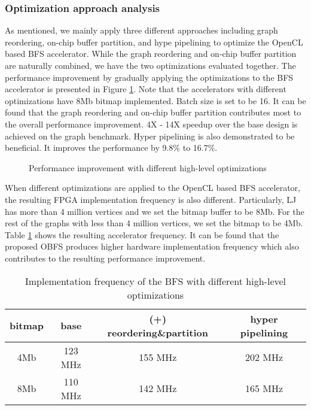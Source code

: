 \subsubsection{Optimization approach analysis}
As mentioned, we mainly apply three different approaches including 
graph reordering, on-chip buffer partition,  
and hype pipelining to optimize the OpenCL based BFS accelerator.
While the graph reordering and on-chip buffer partition are naturally combined, 
we have the two optimizations evaluated together. The performance improvement 
by gradually applying the optimizations to the BFS accelerator is presented 
in Figure \ref{fig:opt-analysis}. Note that the accelerators with different 
optimizations have 8Mb bitmap implemented. Batch size is set to be 16.
It can be found that the graph reordering and on-chip buffer partition 
contributes most to the overall performance improvement. 
4X - 14X speedup over the base design is achieved on the graph benchmark. 
Hyper pipelining is also demonstrated to be beneficial. 
It improves the performance by 9.8\% to 16.7\%. 

 \begin{figure}
	\caption{Performance improvement with different high-level optimizations}
\label{fig:opt-analysis}
\vspace{-1em}
\end{figure}

When different optimizations are applied to the OpenCL based BFS accelerator, 
the resulting FPGA implementation frequency is also different. 
Particularly, LJ has more than 4 million vertices and we set the bitmap buffer to be 8Mb. 
For the rest of the graphs with less than 4 million vertices, we set the bitmap to be 4Mb. 
Table \ref{tab:opt-freq} shows the resulting accelerator frequency. 
It can be found that the proposed OBFS produces higher hardware 
implementation frequency which also contributes to the resulting 
performance improvement. 

\begin{table}
  \caption{Implementation frequency of the BFS with different high-level optimizations}
  \label{tab:opt-freq}
    \setlength{\tabcolsep}{4pt} %
	\centering
  \begin{tabular}{cccc}
    \toprule
	bitmap & base & (+) reordering\&partition & hyper pipelining \\
	\midrule
	4Mb & 123 MHz & 155 MHz & 202 MHz\\
	8Mb & 110 MHz & 142 MHz & 165 MHz\\
  \bottomrule
\end{tabular}
\vspace{-1em}
\end{table}


